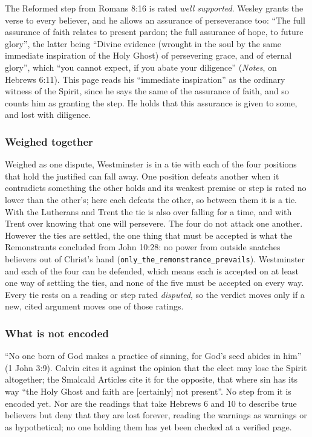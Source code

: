 \documentclass[11pt]{article}
\begin{document}
The Reformed step from Romans 8:16 is rated \emph{well supported}. Wesley grants the verse to every believer, and he allows an assurance of perseverance too: “The full assurance of faith relates to present pardon; the full assurance of hope, to future glory”, the latter being “Divine evidence (wrought in the soul by the same immediate inspiration of the Holy Ghost) of persevering grace, and of eternal glory”, which “you cannot expect, if you abate your diligence” (\emph{Notes}, on Hebrews 6:11). This page reads his “immediate inspiration” as the ordinary witness of the Spirit, since he says the same of the assurance of faith, and so counts him as granting the step. He holds that this assurance is given to some, and lost with diligence.

\subsubsection*{Weighed together}
Weighed as one dispute, Westminster is in a tie with each of the four positions that hold the justified can fall away. One position defeats another when it contradicts something the other holds and its weakest premise or step is rated no lower than the other’s; here each defeats the other, so between them it is a tie. With the Lutherans and Trent the tie is also over falling for a time, and with Trent over knowing that one will persevere. The four do not attack one another. However the ties are settled, the one thing that must be accepted is what the Remonstrants concluded from John 10:28: no power from outside snatches believers out of Christ’s hand (\texttt{only\_\allowbreak{}the\_\allowbreak{}remonstrance\_\allowbreak{}prevails}). Westminster and each of the four can be defended, which means each is accepted on at least one way of settling the ties, and none of the five must be accepted on every way. Every tie rests on a reading or step rated \emph{disputed}, so the verdict moves only if a new, cited argument moves one of those ratings.

\subsubsection*{What is not encoded}
“No one born of God makes a practice of sinning, for God’s seed abides in him” (1 John 3:9). Calvin cites it against the opinion that the elect may lose the Spirit altogether; the Smalcald Articles cite it for the opposite, that where sin has its way “the Holy Ghost and faith are [certainly] not present”. No step from it is encoded yet. Nor are the readings that take Hebrews 6 and 10 to describe true believers but deny that they are lost forever, reading the warnings as warnings or as hypothetical; no one holding them has yet been checked at a verified page.
\end{document}
